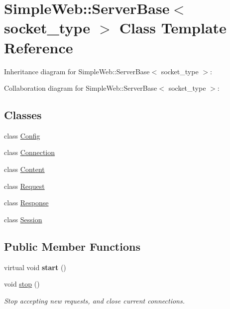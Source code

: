 \hypertarget{classSimpleWeb_1_1ServerBase}{}\section{Simple\+Web\+:\+:Server\+Base$<$ socket\+\_\+type $>$ Class Template Reference}
\label{classSimpleWeb_1_1ServerBase}


Inheritance diagram for Simple\+Web\+:\+:Server\+Base$<$ socket\+\_\+type $>$\+:


Collaboration diagram for Simple\+Web\+:\+:Server\+Base$<$ socket\+\_\+type $>$\+:
\subsection*{Classes}
\begin{DoxyCompactItemize}
\item 
class \hyperlink{classSimpleWeb_1_1ServerBase_1_1Config}{Config}
\item 
class \hyperlink{classSimpleWeb_1_1ServerBase_1_1Connection}{Connection}
\item 
class \hyperlink{classSimpleWeb_1_1ServerBase_1_1Content}{Content}
\item 
class \hyperlink{classSimpleWeb_1_1ServerBase_1_1Request}{Request}
\item 
class \hyperlink{classSimpleWeb_1_1ServerBase_1_1Response}{Response}
\item 
class \hyperlink{classSimpleWeb_1_1ServerBase_1_1Session}{Session}
\end{DoxyCompactItemize}
\subsection*{Public Member Functions}
\begin{DoxyCompactItemize}
\item 
virtual void {\bfseries start} ()\hypertarget{classSimpleWeb_1_1ServerBase_a759d6dae5fa77c47a36f7355fd33f8f7}{}\label{classSimpleWeb_1_1ServerBase_a759d6dae5fa77c47a36f7355fd33f8f7}

\item 
void \hyperlink{classSimpleWeb_1_1ServerBase_a0667e44595f6c23016bee67c646ccc85}{stop} ()\hypertarget{classSimpleWeb_1_1ServerBase_a0667e44595f6c23016bee67c646ccc85}{}\label{classSimpleWeb_1_1ServerBase_a0667e44595f6c23016bee67c646ccc85}

\begin{DoxyCompactList}\small\item\em Stop accepting new requests, and close current connections. \end{DoxyCompactList}\end{DoxyCompactItemize}

